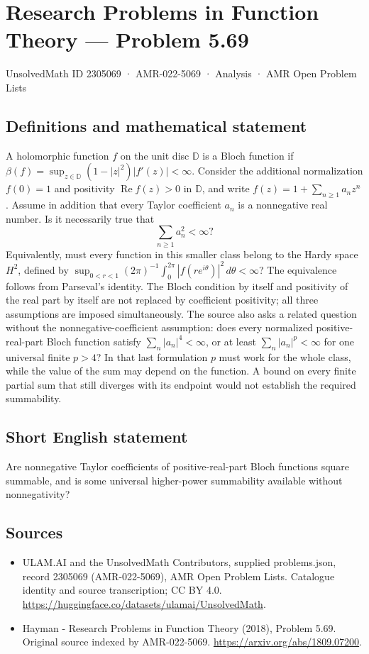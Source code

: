 \documentclass[11pt,a4paper]{article}
\begin{document}
\section*{Research Problems in Function Theory — Problem 5.69}\label{2305069}
{\small UnsolvedMath ID 2305069 · AMR-022-5069 · Analysis · AMR Open Problem Lists}
\subsection{Definitions and mathematical statement}
A holomorphic function $f$ on the unit disc $\mathbb D$ is a Bloch function if
$\beta(f)=\sup_{z\in\mathbb D}(1-|z|^2)|f'(z)|<\infty$.
Consider the additional normalization $f(0)=1$ and positivity $\operatorname{Re}f(z)>0$ in $\mathbb D$, and write $f(z)=1+\sum_{n\ge1}a_nz^n$.
Assume in addition that every Taylor coefficient $a_n$ is a nonnegative real number. Is it necessarily true that
\[
\sum_{n\ge1}a_n^2<\infty?
\]
Equivalently, must every function in this smaller class belong to the Hardy space $H^2$, defined by
$\sup_{0<r<1}(2\pi)^{-1}\int_0^{2\pi}|f(re^{i\theta})|^2\,d\theta<\infty$?
The equivalence follows from Parseval's identity. The Bloch condition by itself and positivity of the real part by itself are not replaced by coefficient positivity; all three assumptions are imposed simultaneously.
The source also asks a related question without the nonnegative-coefficient assumption: does every normalized positive-real-part Bloch function satisfy $\sum_n|a_n|^4<\infty$, or at least $\sum_n|a_n|^p<\infty$ for one universal finite $p>4$? In that last formulation $p$ must work for the whole class, while the value of the sum may depend on the function. A bound on every finite partial sum that still diverges with its endpoint would not establish the required summability.
\subsection{Short English statement}
Are nonnegative Taylor coefficients of positive-real-part Bloch functions square summable, and is some universal higher-power summability available without nonnegativity?
\subsection{Sources}
\begin{itemize}
\item[S1] ULAM.AI and the UnsolvedMath Contributors, supplied problems.json, record 2305069 (AMR-022-5069), AMR Open Problem Lists. Catalogue identity and source transcription; CC BY 4.0.
\url{https://huggingface.co/datasets/ulamai/UnsolvedMath}.
\item[S2] Hayman - Research Problems in Function Theory (2018), Problem 5.69. Original source indexed by AMR-022-5069.
\url{https://arxiv.org/abs/1809.07200}.
\end{itemize}
\end{document}
